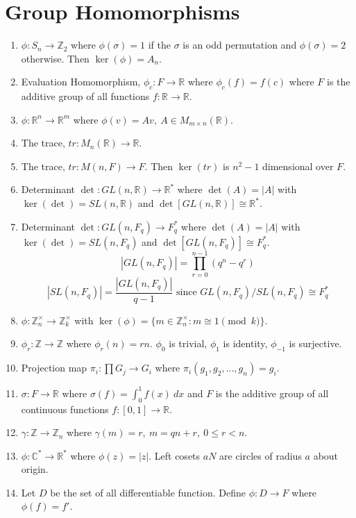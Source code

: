 \section{Group Homomorphisms}
\begin{enumerate}
	\item $\phi : S_n \to \mathbb{Z}_2$ where $\phi(\sigma) = 1$ if the $\sigma$ is an odd permutation and $\phi(\sigma) = 2$ otherwise. Then $\ker(\phi)=A_n$.
	\item Evaluation Homomorphism, $\phi_c : F \to \mathbb{R}$ where $\phi_c(f) = f(c)$ where $F$ is the additive group of all functions $f : \mathbb{R} \to \mathbb{R}$.
	\item $\phi : \mathbb{R}^n \to \mathbb{R}^m$ where $\phi(v) = Av,\ A \in M_{m \times n}(\mathbb{R})$.
	\item The trace, $tr : M_n(\mathbb{R}) \to \mathbb{R}$.
	\item The trace, $tr : M(n,F) \to F$. Then $\ker(tr)$ is $n^2-1$ dimensional over $F$.
	\item Determinant $\det : GL(n,\mathbb{R}) \to \mathbb{R}^\ast$ where $\det(A)=|A|$ with $\ker(\det) = SL(n,\mathbb{R})$ and $\det[GL(n,\mathbb{R})] \cong \mathbb{R}^\ast$.
	\item Determinant $\det : GL(n,F_q) \to F_q^\ast$ where $\det(A)=|A|$ with $\ker(\det) = SL(n,F_q)$ and $\det[GL(n,F_q)] \cong F_q^\ast$.
	$$|GL(n,F_q)| = \prod_{r=0}^{n-1} (q^n-q^r)$$
	$$|SL(n,F_q)| = \frac{|GL(n,F_q)|}{q-1} \text{ since } GL(n,F_q)/SL(n,F_q) \cong F_q^\ast$$
	\item $\phi : \mathbb{Z}_n^\times \to \mathbb{Z}_k^\times$ with $\ker(\phi) = \{ m \in \mathbb{Z}_n^\times : m \cong 1 \pmod{k} \}$.
	\item $\phi_r : \mathbb{Z} \to \mathbb{Z}$ where $\phi_r(n) = rn$. $\phi_0$ is trivial, $\phi_1$ is identity, $\phi_{-1}$ is surjective.
	\item Projection map $\pi_i : \prod G_j \to G_i$ where $\pi_i(g_1,g_2,\dots,g_n) = g_i$.
	\item $\sigma : F \to \mathbb{R}$ where $\sigma(f) = \int_0^1 f(x)\ dx$ and $F$ is the additive group of all continuous functions $f : [0,1] \to \mathbb{R}$.
	\item $\gamma : \mathbb{Z} \to \mathbb{Z}_n$ where $\gamma(m) = r,\ m =qn+r,\ 0 \le r < n$.
	\item $\phi : \mathbb{C}^\ast \to \mathbb{R}^\ast$ where $\phi(z) = |z|$.
	Left cosets $aN$ are circles of radius $a$ about origin.
	\item Let $D$ be the set of all differentiable function. Define $\phi : D \to F$ where $\phi(f) = f'$.

\end{enumerate}
